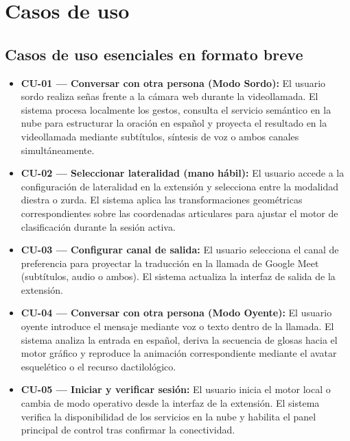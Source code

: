 \section{Casos de uso}

\subsection{Casos de uso esenciales en formato breve}

\begin{itemize}
    \item \textbf{CU-01 --- Conversar con otra persona (Modo Sordo):} El usuario sordo realiza señas frente a la cámara web durante la videollamada. El sistema procesa localmente los gestos, consulta el servicio semántico en la nube para estructurar la oración en español y proyecta el resultado en la videollamada mediante subtítulos, síntesis de voz o ambos canales simultáneamente.
    
    \item \textbf{CU-02 --- Seleccionar lateralidad (mano hábil):} El usuario accede a la configuración de lateralidad en la extensión y selecciona entre la modalidad diestra o zurda. El sistema aplica las transformaciones geométricas correspondientes sobre las coordenadas articulares para ajustar el motor de clasificación durante la sesión activa.
    
    \item \textbf{CU-03 --- Configurar canal de salida:} El usuario selecciona el canal de preferencia para proyectar la traducción en la llamada de Google Meet (subtítulos, audio o ambos). El sistema actualiza la interfaz de salida de la extensión.
    
    \item \textbf{CU-04 --- Conversar con otra persona (Modo Oyente):} El usuario oyente introduce el mensaje mediante voz o texto dentro de la llamada. El sistema analiza la entrada en español, deriva la secuencia de glosas hacia el motor gráfico y reproduce la animación correspondiente mediante el avatar esquelético o el recurso dactilológico.
    
    \item \textbf{CU-05 --- Iniciar y verificar sesión:} El usuario inicia el motor local o cambia de modo operativo desde la interfaz de la extensión. El sistema verifica la disponibilidad de los servicios en la nube y habilita el panel principal de control tras confirmar la conectividad.
\end{itemize}

